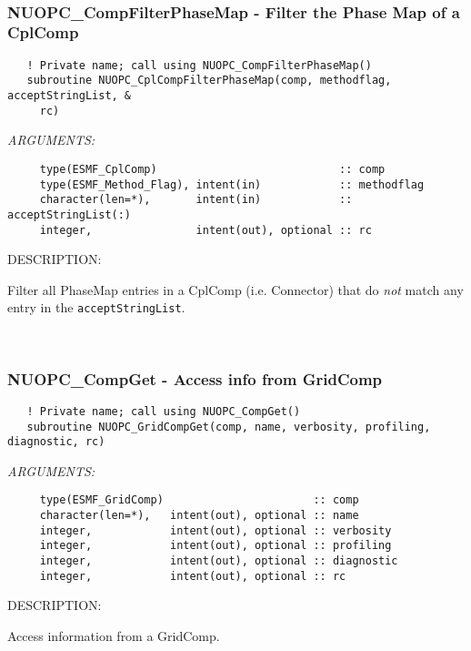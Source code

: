 \mbox{}\hrulefill\ 
 
\subsubsection [NUOPC\_CompFilterPhaseMap] {NUOPC\_CompFilterPhaseMap - Filter the Phase Map of a CplComp}


\begin{verbatim}   ! Private name; call using NUOPC_CompFilterPhaseMap()
   subroutine NUOPC_CplCompFilterPhaseMap(comp, methodflag, acceptStringList, &
     rc)\end{verbatim}{\em ARGUMENTS:}
\begin{verbatim}     type(ESMF_CplComp)                            :: comp
     type(ESMF_Method_Flag), intent(in)            :: methodflag
     character(len=*),       intent(in)            :: acceptStringList(:)
     integer,                intent(out), optional :: rc \end{verbatim}
{\sf DESCRIPTION:\\ }


   Filter all PhaseMap entries in a CplComp (i.e. Connector)
   that do {\em not} match any entry in the {\tt acceptStringList}. 
 
\mbox{}\hrulefill\ 
 
\subsubsection [NUOPC\_CompGet] {NUOPC\_CompGet - Access info from GridComp}


\begin{verbatim}   ! Private name; call using NUOPC_CompGet()
   subroutine NUOPC_GridCompGet(comp, name, verbosity, profiling, diagnostic, rc)\end{verbatim}{\em ARGUMENTS:}
\begin{verbatim}     type(ESMF_GridComp)                       :: comp
     character(len=*),   intent(out), optional :: name
     integer,            intent(out), optional :: verbosity
     integer,            intent(out), optional :: profiling
     integer,            intent(out), optional :: diagnostic
     integer,            intent(out), optional :: rc \end{verbatim}
{\sf DESCRIPTION:\\ }


   Access information from a GridComp. 
 
